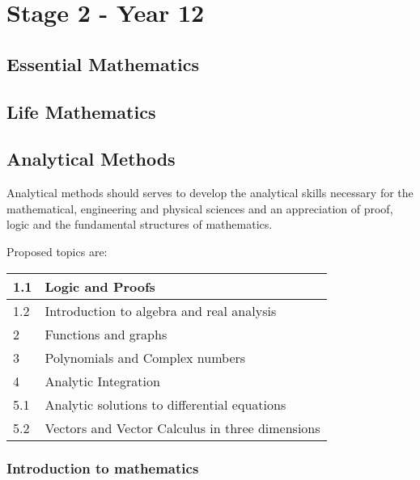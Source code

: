 \documentclass[12pt]{report}
\begin{document}
\section{Stage 2 - Year 12}

\subsection{Essential Mathematics}
\subsection{Life Mathematics}
\subsection{Analytical Methods}
    Analytical methods should serves to develop the analytical skills necessary for the mathematical, engineering and physical sciences and an appreciation of proof, logic and the fundamental structures of mathematics.

    Proposed topics are:
    \begin{table}[H]
        \centering
        \begin{tabular}{|l|l|}
        \hline
            1.1 & Logic and Proofs \\ \hline
            1.2 & Introduction to algebra and real analysis \\ \hline
            2 & Functions and graphs \\ \hline 
            3 & Polynomials and Complex numbers \\ \hline
            4 & Analytic Integration  \\ \hline 
            5.1 & Analytic solutions to differential equations \\ \hline
            5.2 & Vectors and Vector Calculus in three dimensions\\ \hline
        \end{tabular}
    \end{table}

    \subsubsection{Introduction to mathematics}
\end{document}
